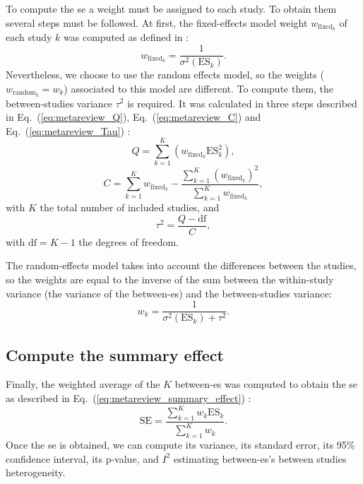 \documentclass[12pt,a4paper,english]{article}
\begin{document}
To compute the \gls{se} a weight must be assigned to each study. To obtain them several steps must be followed. At first, the fixed-effects model 
weight $w_{\text{fixed}_k}$ of each study $k$ was computed as defined in \citet{Borenstein2009}: 
\begin{equation}
\label{eq:metareview_weight_fixed_study}
w_{\text{fixed}_k} = \frac{1}{\sigma^2(\text{ES}_k)}.
\end{equation} 
Nevertheless, we choose to use the random effects model, so the weights ($w_{\text{random}_k} = w_k$) associated to this model are different. 
To compute them, the between-studies variance $\tau^2$ is required. It was calculated in three steps described 
in Eq.~(\ref{eq:metareview_Q}), Eq.~(\ref{eq:metareview_C}) and Eq.~(\ref{eq:metareview_Tau}) 
\citep{Borenstein2009}:
\begin{equation}
\label{eq:metareview_Q}
Q = \sum_{k=1}^{K} (w_{\text{fixed}_k} \text{ES}_k^2),
\end{equation}
\begin{equation}
\label{eq:metareview_C}
C = \sum_{k=1}^{K} w_{\text{fixed}_k} - \frac{ \sum_{k=1}^{K} (w_{\text{fixed}_k})^2 } { \sum_{k=1}^{K} w_{\text{fixed}_k} },
\end{equation}
with $K$ the total number of included studies, and
\begin{equation}
\label{eq:metareview_Tau}
\tau^2 = \frac{Q - \text{df}}{C},
\end{equation}
with $\text{df} = K - 1$ the degrees of freedom.

The random-effects model takes into account the differences between the studies, so the weights are equal to the inverse of the sum between the 
within-study variance (the variance of the between-\gls{es}) and the between-studies variance:
\begin{equation}
\label{eq:metareview_weight_study}
w_k = \frac{1}{\sigma^2(\text{ES}_k) + \tau^2}.
\end{equation} 

\subsection{Compute the summary effect}

Finally, the weighted average of the $K$ between-\gls{es} was computed to obtain the \gls{se} as described in 
Eq.~(\ref{eq:metareview_summary_effect}) \citep{Borenstein2009}:
\begin{equation}
\label{eq:metareview_summary_effect}
\text{SE} = \frac{\sum_{k=1}^{K} w_k \text{ES}_k} {\sum_{k=1}^{K} w_k}.
\end{equation} 
Once the \gls{se}  is obtained, we can compute its variance, its standard error, its 95\% confidence interval, its p-value, 
and $I^2$ estimating between-\gls{es}'s between studies heterogeneity. 
\end{document}
